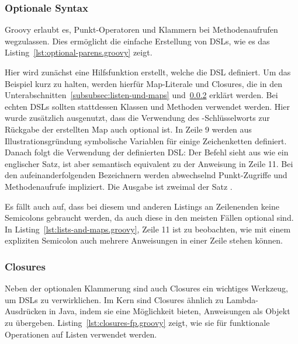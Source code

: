 \subsubsection{Optionale Syntax}\label{subsubsec:optionale-syntax}

Groovy erlaubt es, Punkt-Operatoren und Klammern bei Methodenaufrufen wegzulassen.
Dies ermöglicht die einfache Erstellung von DSLs, wie es das Listing~\ref{lst:optional-parens.groovy} zeigt.


Hier wird zunächst eine Hilfsfunktion  erstellt, welche die DSL definiert.
Um das Beispiel kurz zu halten, werden hierfür Map-Literale und Closures, die in den Unterabschnitten~\ref{subsubsec:listen-und-maps} und~\ref{subsubsec:closures} erklärt werden.
Bei echten DSLs sollten stattdessen Klassen und Methoden verwendet werden.
Hier wurde zusätzlich ausgenutzt, dass die Verwendung des -Schlüsselworts zur Rückgabe der erstellten Map auch optional ist.
In Zeile 9 werden aus Illustrationsgründung symbolische Variablen für einige Zeichenketten definiert.
Danach folgt die Verwendung der definierten DSL:
Der Befehl sieht aus wie ein englischer Satz, ist aber semantisch equivalent zu der Anweisung in Zeile 11.
Bei den aufeinanderfolgenden Bezeichnern werden abwechselnd Punkt-Zugriffe und Methodenaufrufe impliziert.
Die Ausgabe ist zweimal der Satz .

Es fällt auch auf, dass bei diesem und anderen Listings an Zeilenenden keine Semicolons gebraucht werden, da auch diese in den meisten Fällen optional sind.
In Listing~\ref{lst:lists-and-maps.groovy}, Zeile 11 ist zu beobachten, wie mit einem expliziten Semicolon auch mehrere Anweisungen in einer Zeile stehen können.

\subsubsection{Closures}\label{subsubsec:closures}

Neben der optionalen Klammerung sind auch Closures ein wichtiges Werkzeug, um DSLs zu verwirklichen.
Im Kern sind Closures ähnlich zu Lambda-Ausdrücken in Java, indem sie eine Möglichkeit bieten, Anweisungen als Objekt zu übergeben.
Listing~\ref{lst:closures-fp.groovy} zeigt, wie sie für funktionale Operationen auf Listen verwendet werden.

